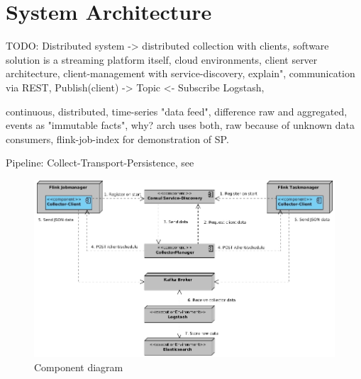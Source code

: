 \chapter{System Architecture}
%
%
%
%

TODO:
Distributed system -> distributed collection with clients, software solution is a streaming platform itself,
cloud environments, client server architecture, client-management with service-discovery, explain", communication via REST,
Publish(client) -> Topic <- Subscribe Logstash,

continuous, distributed, time-series "data feed", difference raw and aggregated\cite{Klepp16},
events as "immutable facts", why?
arch uses both, raw because of unknown data consumers, flink-job-index for demonstration
of SP.

Pipeline: Collect-Transport-Persistence, see \cite{VanL14}

\begin{figure}[H]
	\centering
	\includegraphics[width=1.0\textwidth]{../uml/component-diagram.jpg}
	\caption{Component diagram}
	\label{component-diagram}
\end{figure}

